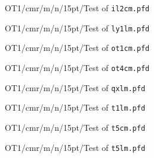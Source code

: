 




\def\testfontdecl#1#2{%
    \expandafter\setfont#1/10pt/%
    \leftline{%
        \hbox to 4cm{\setfont OT1/cmtt/m/n/10pt/#1\hss}%
        The quick brown fox jumps over a lazy dog
    }
    \smallskip
}

\def\testpfd#1{{%
    \centerline{\setfont OT1/cmr/m/n/15pt/Test of \texttt{#1}}
    \bigskip
    
    \let\DeclareFont=\testfontdecl
    
    \vfil\eject
}}

\testpfd{il2cm.pfd}
\testpfd{ly1lm.pfd}
\testpfd{ot1cm.pfd}
\testpfd{ot4cm.pfd}
\testpfd{qxlm.pfd}
\testpfd{t1lm.pfd}
\testpfd{t5cm.pfd}
\testpfd{t5lm.pfd}

\bye
